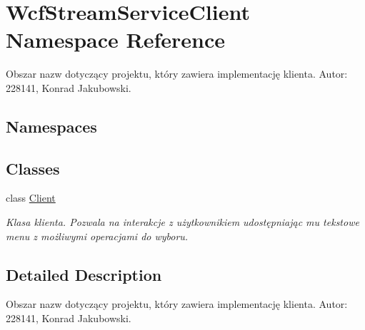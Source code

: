 \hypertarget{namespace_wcf_stream_service_client}{}\section{Wcf\+Stream\+Service\+Client Namespace Reference}
\label{namespace_wcf_stream_service_client}


Obszar nazw dotyczący projektu, który zawiera implementację klienta. Autor\+: 228141, Konrad Jakubowski.  


\subsection*{Namespaces}
\begin{DoxyCompactItemize}
\end{DoxyCompactItemize}
\subsection*{Classes}
\begin{DoxyCompactItemize}
\item 
class \hyperlink{class_wcf_stream_service_client_1_1_client}{Client}
\begin{DoxyCompactList}\small\item\em Klasa klienta. Pozwala na interakcje z użytkownikiem udostępniając mu tekstowe menu z możliwymi operacjami do wyboru. \end{DoxyCompactList}\end{DoxyCompactItemize}


\subsection{Detailed Description}
Obszar nazw dotyczący projektu, który zawiera implementację klienta. Autor\+: 228141, Konrad Jakubowski. 

